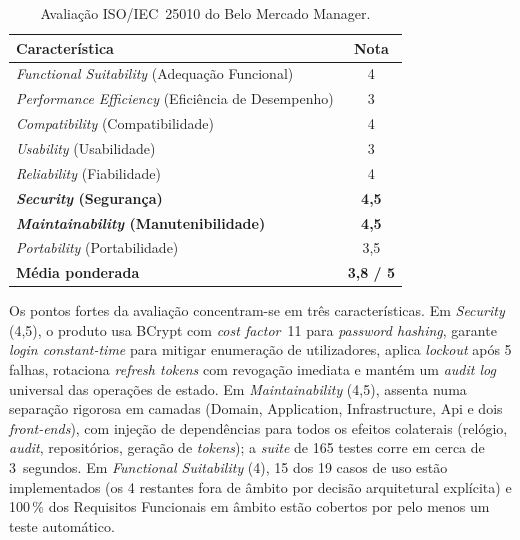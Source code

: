     \begin{table}[H]
    \centering
    \small
    \begin{tabular}{|p{10cm}|c|}
    \hline
    \textbf{Característica} & \textbf{Nota} \\
    \hline
    \textit{Functional Suitability} (Adequação Funcional)       & 4 \\
    \hline
    \textit{Performance Efficiency} (Eficiência de Desempenho)  & 3 \\
    \hline
    \textit{Compatibility} (Compatibilidade)                    & 4 \\
    \hline
    \textit{Usability} (Usabilidade)                            & 3 \\
    \hline
    \textit{Reliability} (Fiabilidade)                          & 4 \\
    \hline
    \textbf{\textit{Security} (Segurança)}                      & \textbf{4,5} \\
    \hline
    \textbf{\textit{Maintainability} (Manutenibilidade)}        & \textbf{4,5} \\
    \hline
    \textit{Portability} (Portabilidade)                        & 3,5 \\
    \hline
    \textbf{Média ponderada}                                    & \textbf{3,8 / 5} \\
    \hline
    \end{tabular}
    \caption{Avaliação ISO/IEC~25010 do Belo Mercado Manager.}
    \label{tab:iso25010_resumo}
    \end{table}

    Os pontos fortes da avaliação concentram-se em três características. Em \textit{Security} (4,5), o produto usa BCrypt com \textit{cost factor}~11 para \textit{password hashing}, garante \textit{login constant-time} para mitigar enumeração de utilizadores, aplica \textit{lockout} após 5 falhas, rotaciona \textit{refresh tokens} com revogação imediata e mantém um \textit{audit log} universal das operações de estado. Em \textit{Maintainability} (4,5), assenta numa separação rigorosa em camadas (Domain, Application, Infrastructure, Api e dois \textit{front-ends}), com injeção de dependências para todos os efeitos colaterais (relógio, \textit{audit}, repositórios, geração de \textit{tokens}); a \textit{suite} de 165 testes corre em cerca de 3~segundos. Em \textit{Functional Suitability} (4), 15 dos 19 casos de uso estão implementados (os 4 restantes fora de âmbito por decisão arquitetural explícita) e 100\,\% dos Requisitos Funcionais em âmbito estão cobertos por pelo menos um teste automático.

